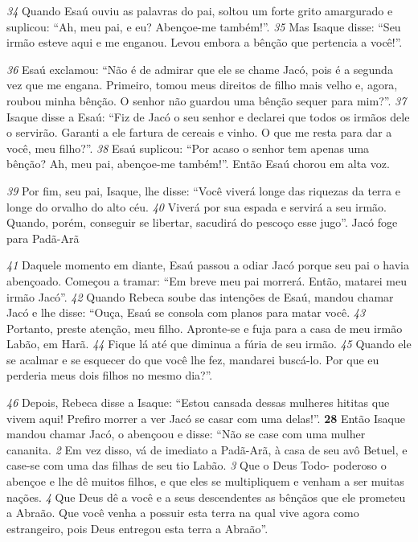 \bigskip
\textit{\tiny 34}
Quando Esaú ouviu as palavras do pai, soltou um forte grito amargurado e
suplicou: “Ah, meu pai, e eu? Abençoe-me também!”.
\textit{\tiny 35}
Mas Isaque disse: “Seu irmão esteve aqui e me enganou. Levou embora a
bênção que pertencia a você!”.
   
\bigskip
\textit{\tiny 36}
Esaú exclamou: “Não é de admirar que ele se chame Jacó, pois é a segunda
vez que me engana. Primeiro, tomou meus direitos de filho mais velho e, agora,
roubou minha bênção. O senhor não guardou uma bênção sequer para mim?”.
\textit{\tiny 37}
Isaque disse a Esaú: “Fiz de Jacó o seu senhor e declarei que todos os irmãos
dele o servirão. Garanti a ele fartura de cereais e vinho. O que me resta para dar a
você, meu filho?”.
\textit{\tiny 38}
Esaú suplicou: “Por acaso o senhor tem apenas uma bênção? Ah, meu pai,
abençoe-me também!”. Então Esaú chorou em alta voz.
   
\bigskip
\textit{\tiny 39}
Por fim, seu pai, Isaque, lhe disse:
  “Você viverá longe das riquezas da terra
    e longe do orvalho do alto céu.
\textit{\tiny 40}
Viverá por sua espada
    e servirá a seu irmão.
  Quando, porém, conseguir se libertar,
    sacudirá do pescoço esse jugo”.
Jacó foge para Padã-Arã

\bigskip
\textit{\tiny 41}
Daquele momento em diante, Esaú passou a odiar Jacó porque seu pai o havia
abençoado. Começou a tramar: “Em breve meu pai morrerá. Então, matarei meu
irmão Jacó”.
\textit{\tiny 42}
Quando Rebeca soube das intenções de Esaú, mandou chamar Jacó e lhe
disse: “Ouça, Esaú se consola com planos para matar você. 
\textit{\tiny 43}
Portanto, preste
atenção, meu filho. Apronte-se e fuja para a casa de meu irmão Labão, em Harã.
\textit{\tiny 44}
Fique lá até que diminua a fúria de seu irmão. 
\textit{\tiny 45}
Quando ele se acalmar e se
esquecer do que você lhe fez, mandarei buscá-lo. Por que eu perderia meus dois
filhos no mesmo dia?”.

\bigskip
\textit{\tiny 46}
Depois, Rebeca disse a Isaque: “Estou cansada dessas mulheres hititas que
vivem aqui! Prefiro morrer a ver Jacó se casar com uma delas!”.
\textbf{\large 28}
 Então Isaque mandou chamar Jacó, o abençoou e disse: “Não se case com
uma mulher cananita. 
\textit{\tiny 2}
Em vez disso, vá de imediato a Padã-Arã, à casa de seu avô
Betuel, e case-se com uma das filhas de seu tio Labão. 
\textit{\tiny 3}
Que o Deus Todo-
poderoso o abençoe e lhe dê muitos filhos, e que eles se multipliquem e venham
a ser muitas nações. 
\textit{\tiny 4}
Que Deus dê a você e a seus descendentes as bênçãos que
ele prometeu a Abraão. Que você venha a possuir esta terra na qual vive agora
como estrangeiro, pois Deus entregou esta terra a Abraão”.

